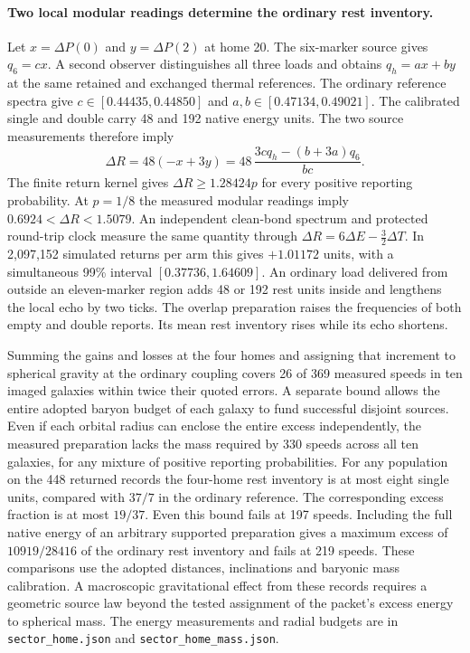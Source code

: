 \documentclass[11pt]{article}
\begin{document}
\paragraph{Two local modular readings determine the ordinary rest inventory.}
Let \(x=\Delta P(0)\) and \(y=\Delta P(2)\) at home 20. The
six-marker source gives \(q_6=cx\). A second observer distinguishes
all three loads and obtains \(q_h=ax+by\) at the same retained and
exchanged thermal references. The ordinary reference spectra give
\(c\in[0.44435,0.44850]\) and \(a,b\in[0.47134,0.49021]\).
The calibrated single and double carry 48 and 192 native energy
units. The two source measurements therefore imply
\[
 \Delta R=48(-x+3y)=48\,\frac{3c q_h-(b+3a)q_6}{bc}.
\]
The finite return kernel gives \(\Delta R\ge 1.28424p\) for every
positive reporting probability. At \(p=1/8\) the measured modular
readings imply \(0.6924<\Delta R<1.5079\). An independent clean-bond
spectrum and protected round-trip clock measure the same quantity
through \(\Delta R=6\Delta E-\tfrac32\Delta T\). In 2,097,152
simulated returns per arm this gives \(+1.01172\) units, with a
simultaneous 99\% interval \([0.37736,1.64609]\). An ordinary load
delivered from outside an eleven-marker region adds 48 or 192 rest
units inside and lengthens the local echo by two ticks. The overlap
preparation raises the frequencies of both empty and double reports.
Its mean rest inventory rises while its echo shortens.

Summing the gains and losses at the four homes and assigning that
increment to spherical gravity at the ordinary coupling covers 26 of
369 measured speeds in ten imaged galaxies within twice their quoted
errors. A separate bound allows the entire adopted baryon budget
of each galaxy to fund successful disjoint sources. Even if each
orbital radius can enclose the entire excess independently, the
measured preparation lacks the mass required by 330 speeds across
all ten galaxies, for any mixture of positive reporting probabilities.
For any population on the 448 returned records the four-home rest
inventory is at most eight single units, compared with \(37/7\) in
the ordinary reference. The corresponding excess fraction is at most
\(19/37\). Even this bound fails at 197 speeds. Including the full
native energy of an arbitrary supported preparation gives a maximum
excess of \(10919/28416\) of the ordinary rest inventory and fails at
219 speeds. These comparisons use the adopted distances, inclinations
and baryonic mass calibration. A macroscopic gravitational effect
from these records requires a geometric source law beyond the
tested assignment of the packet's excess energy to spherical mass.
The energy measurements and radial budgets are in
\texttt{sector\_home.json} and \texttt{sector\_home\_mass.json}.
\end{document}
